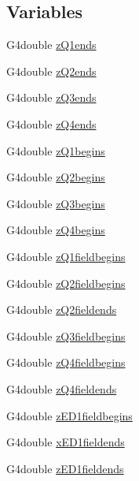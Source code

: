 \subsection*{Variables}
\begin{DoxyCompactItemize}
\item 
G4double \hyperlink{EMFieldDebugger_8hh_a8825e4bac9c627d0fc56ceb808baee99}{z\+Q1ends}
\item 
G4double \hyperlink{EMFieldDebugger_8hh_a0389aed4a205ff7970a9c57db9776625}{z\+Q2ends}
\item 
G4double \hyperlink{EMFieldDebugger_8hh_aa309293d04a3e9edd55505001bb8842f}{z\+Q3ends}
\item 
G4double \hyperlink{EMFieldDebugger_8hh_aaefdf69418ceee3aabc72a346eef1799}{z\+Q4ends}
\item 
G4double \hyperlink{EMFieldDebugger_8hh_a63b4d37f848ab857400025988ebc68ac}{z\+Q1begins}
\item 
G4double \hyperlink{EMFieldDebugger_8hh_a62d0de84d7d6b0923e982b354afad285}{z\+Q2begins}
\item 
G4double \hyperlink{EMFieldDebugger_8hh_a12daa717eecd47b0ce06c1314040fc3c}{z\+Q3begins}
\item 
G4double \hyperlink{EMFieldDebugger_8hh_ab2b8c71527a18e35d81eb8bd6e7691f4}{z\+Q4begins}
\item 
G4double \hyperlink{EMFieldDebugger_8hh_aad92ec801d3e4699e64b73238d977d97}{z\+Q1fieldbegins}
\item 
G4double \hyperlink{EMFieldDebugger_8hh_a312fb44f7507d957ccc70c34d5d94a43}{z\+Q2fieldbegins}
\item 
G4double \hyperlink{EMFieldDebugger_8hh_a92fc8c51d58e20801f34d52f8a2c7a2b}{z\+Q2fieldends}
\item 
G4double \hyperlink{EMFieldDebugger_8hh_a077f13a115281633166d7450d5f26fa0}{z\+Q3fieldbegins}
\item 
G4double \hyperlink{EMFieldDebugger_8hh_afb3a8a6427088f204ef91b7361831904}{z\+Q4fieldbegins}
\item 
G4double \hyperlink{EMFieldDebugger_8hh_a2f06aa9a2a32a33fa1100ce176ab4636}{z\+Q4fieldends}
\item 
G4double \hyperlink{EMFieldDebugger_8hh_a3feee11b7c51f66f2b05335422fd6766}{z\+E\+D1fieldbegins}
\item 
G4double \hyperlink{EMFieldDebugger_8hh_ab9ae78ef340f126ece97727282006616}{x\+E\+D1fieldends}
\item 
G4double \hyperlink{EMFieldDebugger_8hh_a233a000653cf27b6f9124c2a55731df1}{z\+E\+D1fieldends}
\item 

\end{DoxyCompactItemize}
